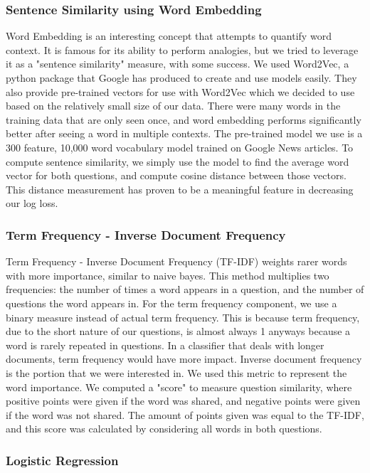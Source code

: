 \documentclass{article}
\begin{document}
\subsubsection{Sentence Similarity using Word Embedding}

Word Embedding is an interesting concept that attempts to quantify word context. It is famous for its ability to perform analogies, but we tried to leverage it as a "sentence similarity" measure, with some success. We used Word2Vec, a python package that Google has produced to create and use models easily. They also provide pre-trained vectors for use with Word2Vec which we decided to use based on the relatively small size of our data. There were many words in the training data that are only seen once, and word embedding performs significantly better after seeing a word in multiple contexts. The pre-trained model we use is a 300 feature, 10,000 word vocabulary model trained on Google News articles. To compute sentence similarity, we simply use the model to find the average word vector for both questions, and compute cosine distance between those vectors. This distance measurement has proven to be a meaningful feature in decreasing our log loss.

\subsubsection{Term Frequency - Inverse Document Frequency}

Term Frequency - Inverse Document Frequency (TF-IDF) weights rarer words with more importance, similar to naive bayes. This method multiplies two frequencies: the number of times a word appears in a question, and the number of questions the word appears in. For the term frequency component, we use a binary measure instead of actual term frequency. This is because term frequency, due to the short nature of our questions, is almost always 1 anyways because a word is rarely repeated in questions. In a classifier that deals with longer documents, term frequency would have more impact. Inverse document frequency is the portion that we were interested in. We used this metric to represent the word importance. We computed a "score" to measure question similarity, where positive points were given if the word was shared, and negative points were given if the word was not shared. The amount of points given was equal to the TF-IDF, and this score was calculated by considering all words in both questions. 

\subsubsection{Logistic Regression}
\end{document}
